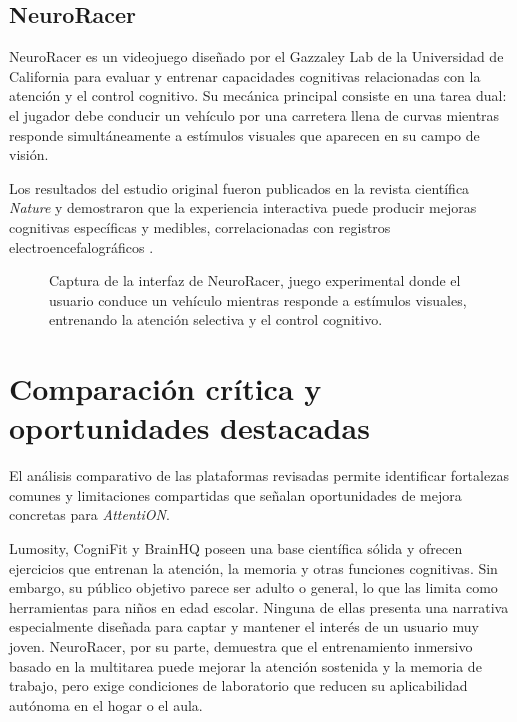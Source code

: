 \documentclass[12pt, a4paper]{report}
\begin{document}
\subsection{NeuroRacer}

NeuroRacer es un videojuego diseñado por el Gazzaley Lab de la Universidad de
California para evaluar y entrenar capacidades cognitivas relacionadas con la
atención y el control cognitivo. Su mecánica principal consiste en una tarea
dual: el jugador debe conducir un vehículo por una carretera llena de curvas
mientras responde simultáneamente a estímulos visuales que aparecen en su
campo de visión.

Los resultados del estudio original fueron publicados en la revista científica
\textit{Nature} y demostraron que la experiencia interactiva puede producir
mejoras cognitivas específicas y medibles, correlacionadas con registros
electroencefalográficos \citep{Anguera2013}.

\begin{figure}[H]
  \centering
  \caption{Captura de la interfaz de NeuroRacer, juego experimental donde el
    usuario conduce un vehículo mientras responde a estímulos visuales,
    entrenando la atención selectiva y el control cognitivo.}
  \label{fig:neuroracer}
\end{figure}

\section{Comparación crítica y oportunidades destacadas}

El análisis comparativo de las plataformas revisadas permite identificar
fortalezas comunes y limitaciones compartidas que señalan oportunidades de
mejora concretas para \textit{AttentiON}.

Lumosity, CogniFit y BrainHQ poseen una base científica sólida y ofrecen
ejercicios que entrenan la atención, la memoria y otras funciones cognitivas.
Sin embargo, su público objetivo parece ser adulto o general, lo que las limita
como herramientas para niños en edad escolar. Ninguna de ellas presenta una
narrativa especialmente diseñada para captar y mantener el interés de un usuario
muy joven. NeuroRacer, por su parte, demuestra que el entrenamiento inmersivo
basado en la multitarea puede mejorar la atención sostenida y la memoria de
trabajo, pero exige condiciones de laboratorio que reducen su aplicabilidad
autónoma en el hogar o el aula.
\end{document}
